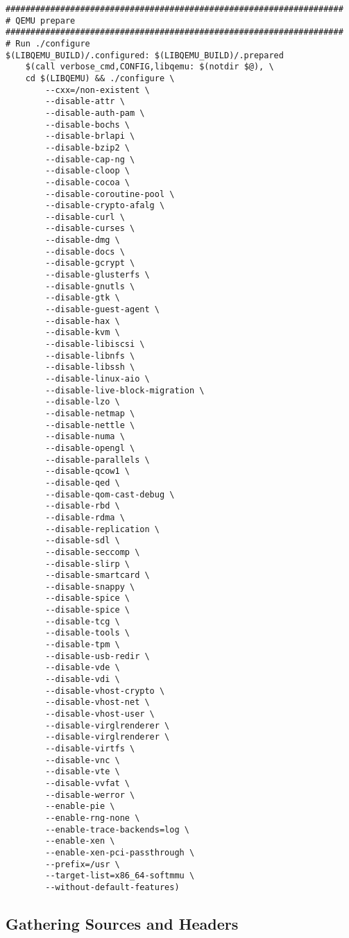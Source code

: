 \begin{lstlisting}
####################################################################
# QEMU prepare
####################################################################
# Run ./configure
$(LIBQEMU_BUILD)/.configured: $(LIBQEMU_BUILD)/.prepared
	$(call verbose_cmd,CONFIG,libqemu: $(notdir $@), \
	cd $(LIBQEMU) && ./configure \
        --cxx=/non-existent \
        --disable-attr \
        --disable-auth-pam \
        --disable-bochs \
        --disable-brlapi \
        --disable-bzip2 \
        --disable-cap-ng \
        --disable-cloop \
        --disable-cocoa \
        --disable-coroutine-pool \
        --disable-crypto-afalg \
        --disable-curl \
        --disable-curses \
        --disable-dmg \
        --disable-docs \
        --disable-gcrypt \
        --disable-glusterfs \
        --disable-gnutls \
        --disable-gtk \
        --disable-guest-agent \
        --disable-hax \
        --disable-kvm \
        --disable-libiscsi \
        --disable-libnfs \
        --disable-libssh \
        --disable-linux-aio \
        --disable-live-block-migration \
        --disable-lzo \
        --disable-netmap \
        --disable-nettle \
        --disable-numa \
        --disable-opengl \
        --disable-parallels \
        --disable-qcow1 \
        --disable-qed \
        --disable-qom-cast-debug \
        --disable-rbd \
        --disable-rdma \
        --disable-replication \
        --disable-sdl \
        --disable-seccomp \
        --disable-slirp \
        --disable-smartcard \
        --disable-snappy \
        --disable-spice \
        --disable-spice \
        --disable-tcg \
        --disable-tools \
        --disable-tpm \
        --disable-usb-redir \
        --disable-vde \
        --disable-vdi \
        --disable-vhost-crypto \
        --disable-vhost-net \
        --disable-vhost-user \
        --disable-virglrenderer \
        --disable-virglrenderer \
        --disable-virtfs \
        --disable-vnc \
        --disable-vte \
        --disable-vvfat \
        --disable-werror \
        --enable-pie \
        --enable-rng-none \
        --enable-trace-backends=log \
        --enable-xen \
        --enable-xen-pci-passthrough \
        --prefix=/usr \
        --target-list=x86_64-softmmu \
        --without-default-features)
\end{lstlisting}

\subsection{Gathering Sources and Headers}
\label{subsec:gathering-sources-headers}

